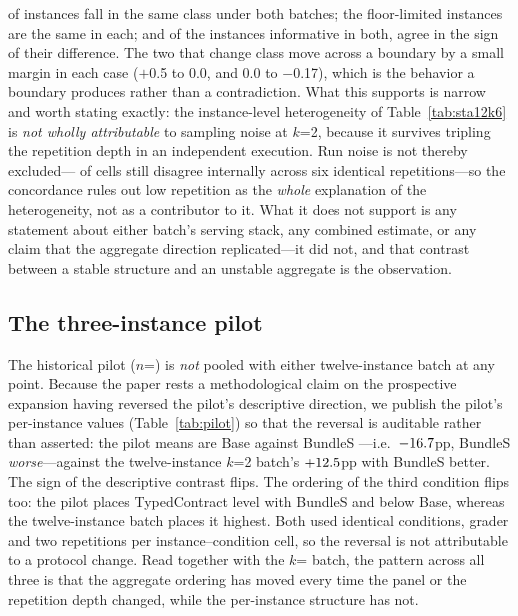 \documentclass{article}
\begin{document}
\noindent \StatConcordSame{} of \StatConcordTotal{} instances fall in the same class under both batches; the \StatEightAFloorN{} floor-limited instances are the same \StatEightAFloorN{} in each; and of the \StatConcordSignOf{} instances informative in both, \StatConcordSignAgree{} agree in the sign of their difference. The two that change class move across a boundary by a small margin in each case ($+$0.5 to 0.0, and 0.0 to $-$0.17), which is the behavior a boundary produces rather than a contradiction. What this supports is narrow and worth stating exactly: the instance-level heterogeneity of Table~\ref{tab:sta12k6} is \emph{not wholly attributable} to sampling noise at $k$=2, because it survives tripling the repetition depth in an independent execution. Run noise is not thereby excluded---\StatEightAUnstableCells{} of \StatEightACells{} cells still disagree internally across six identical repetitions---so the concordance rules out low repetition as the \emph{whole} explanation of the heterogeneity, not as a contributor to it. What it does not support is any statement about either batch's serving stack, any combined estimate, or any claim that the aggregate direction replicated---it did not, and that contrast between a stable structure and an unstable aggregate is the observation.

\subsection*{The three-instance pilot}

\begin{table}[h]
\centering\footnotesize
\caption{Three-instance STA pilot: per-instance correct-rates over two repetitions, published so the direction reversal against the twelve-instance $k$=2 batch (Table~\ref{tab:sta12}) can be checked. Generated from the frozen collection report by the same committed script that produces the interval estimates.}
\label{tab:pilot}

\end{table}

\noindent The historical pilot ($n$=\StatPilotN{}) is \emph{not} pooled with either twelve-instance batch at any point. Because the paper rests a methodological claim on the prospective expansion having reversed the pilot's descriptive direction, we publish the pilot's per-instance values (Table~\ref{tab:pilot}) so that the reversal is auditable rather than asserted: the pilot means are Base \StatPilotBase{} against BundleS \StatPilotBundleS{}---i.e.\ $-16.7$pp, BundleS \emph{worse}---against the twelve-instance $k$=2 batch's $+12.5$pp with BundleS better. The sign of the descriptive contrast flips. The ordering of the third condition flips too: the pilot places TypedContract level with BundleS and below Base, whereas the twelve-instance batch places it highest. Both used identical conditions, grader and two repetitions per instance--condition cell, so the reversal is not attributable to a protocol change. Read together with the $k$=\StatEightAK{} batch, the pattern across all three is that the aggregate ordering has moved every time the panel or the repetition depth changed, while the per-instance structure has not.
\end{document}
